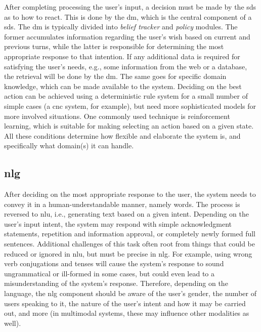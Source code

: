 After completing processing the user's input, a decision must be made by the \ac{sds} as to how to react.
This is done by the \acf{dm}, which is the central component of a \ac{sds}.
The \ac{dm} is typically divided into \emph{belief tracker} and \emph{policy} modules.
The former accumulates information regarding the user's wish based on current and previous turns, while the latter is responsible for determining the most appropriate response to that intention.
If any additional data is required for satisfying the user's needs, e.g., some information from the web or a database, the retrieval will be done by the \ac{dm}.
The same goes for specific domain knowledge, which can be made available to the system.
Deciding on the best action can be achieved using a deterministic rule system for a small number of simple cases (a \ac{cnc} system, for example), but need more sophisticated models for more involved situations.
One commonly used technique is reinforcement learning, which is suitable for making selecting an action based on a given state.
All these conditions determine how flexible and elaborate the system is, and specifically what domain(s) it can handle.


\subsection{\Acl{nlg}}
\label{subsec:natural_language_generation}

After deciding on the most appropriate response to the user, the system needs to convey it in a human-understandable manner, namely words.
The process is reversed to \ac{nlu}, i.e., generating text based on a given intent.
Depending on the user's input intent, the system may respond with simple acknowledgment statements, repetition and information approval, or completely newly formed full sentences.
Additional challenges of this task often root from things that could be reduced or ignored in \ac{nlu}, but must be precise in \ac{nlg}.
For example, using wrong verb conjugations and tenses will cause the system's response to sound ungrammatical or ill-formed in some cases, but could even lead to a misunderstanding of the system's response.
Therefore, depending on the language, the \ac{nlg} component should be aware of the user's gender, the number of users speaking to it, the nature of the user's intent and how it may be carried out, and more (in multimodal systems, these may influence other modalities as well).

